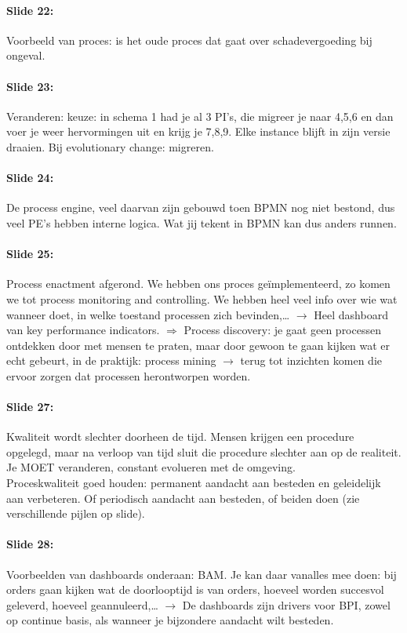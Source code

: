 \documentclass[10pt,a4paper]{report}
\begin{document}
\paragraph{Slide 22:}Voorbeeld van proces: is het oude proces dat gaat over schadevergoeding bij ongeval.

\paragraph{Slide 23:}Veranderen: keuze: in schema 1 had je al 3 PI's, die migreer je naar 4,5,6 en dan voer je weer hervormingen uit en krijg je 7,8,9. Elke instance blijft in zijn versie draaien. Bij evolutionary change: migreren.

\paragraph{Slide 24:}De process engine, veel daarvan zijn gebouwd toen BPMN nog niet bestond, dus veel PE's hebben interne logica. Wat jij tekent in BPMN kan dus anders runnen.

\paragraph{Slide 25:}Process enactment afgerond. We hebben ons proces geïmplementeerd, zo komen we tot process monitoring and controlling. We hebben heel veel info over wie wat wanneer doet, in welke toestand processen zich bevinden,… $\rightarrow$ Heel dashboard van key performance indicators. $\Rightarrow$ Process discovery: je gaat geen processen ontdekken door met mensen te praten, maar door gewoon te gaan kijken wat er echt gebeurt, in de praktijk: process mining $\rightarrow$ terug tot inzichten komen die ervoor zorgen dat processen herontworpen worden.

\paragraph{Slide 27:}Kwaliteit wordt slechter doorheen de tijd. Mensen krijgen een procedure opgelegd, maar na verloop van tijd sluit die procedure slechter aan op de realiteit. Je MOET veranderen, constant evolueren met de omgeving.\\
Proceskwaliteit goed houden: permanent aandacht aan besteden en geleidelijk aan verbeteren. Of periodisch aandacht aan besteden, of beiden doen (zie verschillende pijlen op slide).

\paragraph{Slide 28:}Voorbeelden van dashboards onderaan: BAM. Je kan daar vanalles mee doen: bij orders gaan kijken wat de doorlooptijd is van orders, hoeveel worden succesvol geleverd, hoeveel geannuleerd,… $\rightarrow$ De dashboards zijn drivers voor BPI, zowel op continue basis, als wanneer je bijzondere aandacht wilt besteden.
\end{document}
